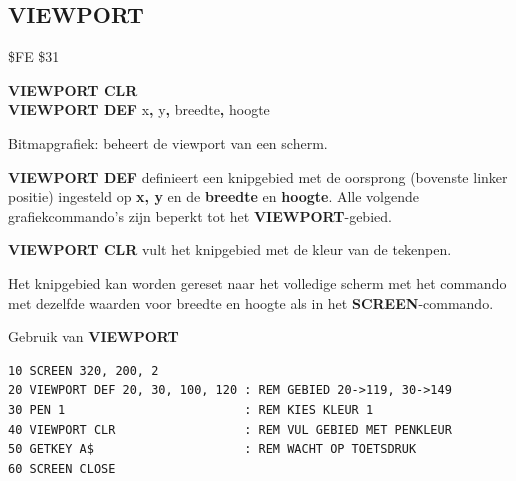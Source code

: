 \newpage
\subsection{VIEWPORT}
\begin{description}[leftmargin=2cm,style=nextline]
\item [Token:]    \$FE \$31

\item [Formaat:]   {\bf VIEWPORT CLR} \\           	   {\bf VIEWPORT DEF} x{\bf,} y{\bf,} breedte{\bf,} hoogte

\item [Gebruik:]    Bitmapgrafiek: beheert de viewport van een scherm.

                  {\bf VIEWPORT DEF} definieert een knipgebied met de oorsprong (bovenste linker positie) ingesteld op {\bf x, y} en de {\bf breedte} en {\bf hoogte}. Alle volgende grafiekcommando's zijn beperkt tot het {\bf VIEWPORT}-gebied.

                  {\bf VIEWPORT CLR} vult het knipgebied met de kleur van de tekenpen.

\item [Opmerkingen:]  Het knipgebied kan worden gereset naar het volledige scherm met het commando  met dezelfde waarden voor breedte en hoogte als in het {\bf SCREEN}-commando.

\item [Voorbeeld:]  Gebruik van {\bf VIEWPORT}

\begin{tcolorbox}[colback=black,coltext=white]
\verbatimfont{\codefont}
\begin{verbatim}
10 SCREEN 320, 200, 2
20 VIEWPORT DEF 20, 30, 100, 120 : REM GEBIED 20->119, 30->149
30 PEN 1                         : REM KIES KLEUR 1
40 VIEWPORT CLR                  : REM VUL GEBIED MET PENKLEUR
50 GETKEY A$                     : REM WACHT OP TOETSDRUK
60 SCREEN CLOSE
\end{verbatim}
\end{tcolorbox}
\end{description}


\newpage
